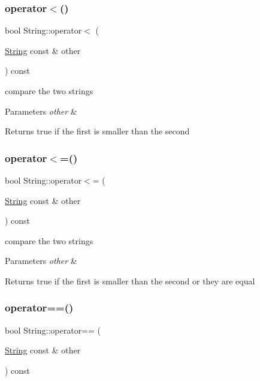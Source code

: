\subsubsection{\texorpdfstring{operator$<$()}{operator<()}}
{\footnotesize\ttfamily bool String\+::operator$<$ (\begin{DoxyParamCaption}\item[{\hyperlink{classString}{String} const \&}]{other }\end{DoxyParamCaption}) const}

compare the two strings 
\begin{DoxyParams}{Parameters}
{\em other} & \\
\hline
\end{DoxyParams}
\begin{DoxyReturn}{Returns}
true if the first is smaller than the second 
\end{DoxyReturn}
\mbox{\label{classString_a2ee4e8d42626851256a5432bf838d5f9}} 
\subsubsection{\texorpdfstring{operator$<$=()}{operator<=()}}
{\footnotesize\ttfamily bool String\+::operator$<$= (\begin{DoxyParamCaption}\item[{\hyperlink{classString}{String} const \&}]{other }\end{DoxyParamCaption}) const}

compare the two strings 
\begin{DoxyParams}{Parameters}
{\em other} & \\
\hline
\end{DoxyParams}
\begin{DoxyReturn}{Returns}
true if the first is smaller than the second or they are equal 
\end{DoxyReturn}
\mbox{\label{classString_a2525ca0e0fd8e1a63d947f39ebc5e4d0}} 
\subsubsection{\texorpdfstring{operator==()}{operator==()}}
{\footnotesize\ttfamily bool String\+::operator== (\begin{DoxyParamCaption}\item[{\hyperlink{classString}{String} const \&}]{other }\end{DoxyParamCaption}) const}

